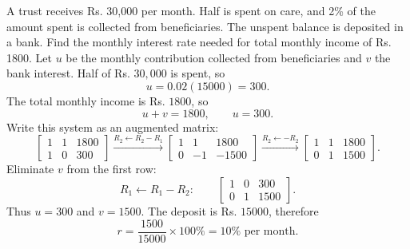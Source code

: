 \begin{enumerate}[label={},leftmargin=0pt,itemsep=9pt]
 A trust receives Rs. 30,000 per month. Half is spent on care, and 2\% of the amount spent is collected from beneficiaries. The unspent balance is deposited in a bank. Find the monthly interest rate needed for total monthly income of Rs. 1800.
\solution Let $u$ be the monthly contribution collected from beneficiaries and $v$ the bank interest. Half of Rs. $30,000$ is spent, so
\[
u=0.02(15000)=300.
\]
The total monthly income is Rs. $1800$, so
\[
u+v=1800,\qquad u=300.
\]
Write this system as an augmented matrix:
\[
\left[\begin{array}{cc|c}1&1&1800\\1&0&300\end{array}\right]
\xrightarrow{R_2\leftarrow R_2-R_1}
\left[\begin{array}{cc|c}1&1&1800\\0&-1&-1500\end{array}\right]
\xrightarrow{R_2\leftarrow -R_2}
\left[\begin{array}{cc|c}1&1&1800\\0&1&1500\end{array}\right].
\]
Eliminate $v$ from the first row:
\[
R_1\leftarrow R_1-R_2:\qquad
\left[\begin{array}{cc|c}1&0&300\\0&1&1500\end{array}\right].
\]
Thus $u=300$ and $v=1500$. The deposit is Rs. $15000$, therefore
\[
r=\frac{1500}{15000}\times100\%=\boxed{10\%\text{ per month}}.
\]

\end{enumerate}

